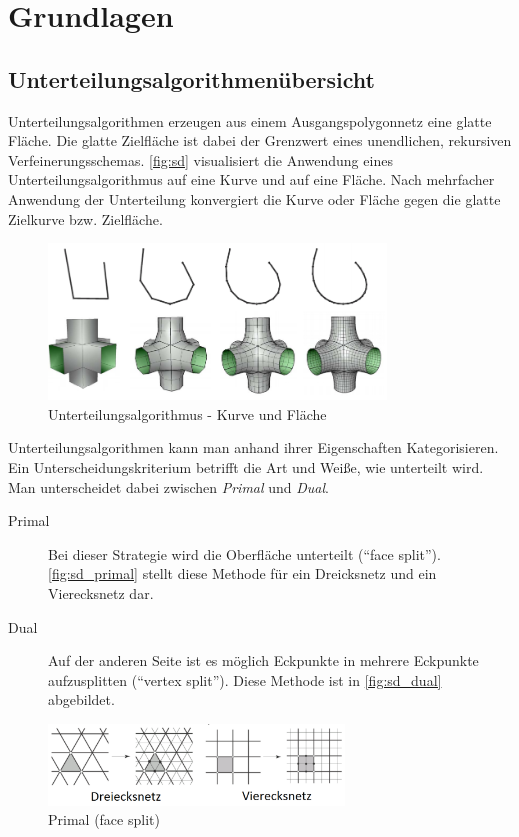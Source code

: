 \chapter{Grundlagen}


\section{Unterteilungsalgorithmenübersicht}

Unterteilungsalgorithmen erzeugen aus einem Ausgangspolygonnetz eine glatte Fläche.
Die glatte Zielfläche ist dabei der Grenzwert eines unendlichen, rekursiven Verfeinerungsschemas.
\autoref{fig:sd} visualisiert die Anwendung eines Unterteilungsalgorithmus auf eine Kurve und auf eine Fläche.
Nach mehrfacher Anwendung der Unterteilung konvergiert die Kurve oder Fläche gegen die glatte Zielkurve bzw. Zielfläche.

\begin{figure}
  \centering
  \includegraphics[width=0.8\textwidth]{content/media/sd.png}
  \caption{Unterteilungsalgorithmus - Kurve und Fläche \cite{Standford.24.07.2015}}
  \label{fig:sd}
\end{figure}

Unterteilungsalgorithmen kann man anhand ihrer Eigenschaften Kategorisieren.
Ein Unterscheidungskriterium betrifft die Art und Weiße, wie unterteilt wird.
Man unterscheidet dabei zwischen \emph{Primal} und \emph{Dual}.

\begin{description}
 \item[Primal] Bei dieser Strategie wird die Oberfläche unterteilt (\enquote{face split}).
\autoref{fig:sd_primal} stellt diese Methode für ein Dreicksnetz und ein Vierecksnetz dar.
 \item[Dual] Auf der anderen Seite ist es möglich Eckpunkte in mehrere Eckpunkte aufzusplitten (\enquote{vertex split}).
 Diese Methode ist in \autoref{fig:sd_dual} abgebildet.

\end{description}
\begin{figure}
  \centering
  \includegraphics[width=0.7\textwidth]{content/media/sd_primal}
  \caption{Primal (face split) \cite{Standford.24.07.2015}}
  \label{fig:sd_primal}
\end{figure}

